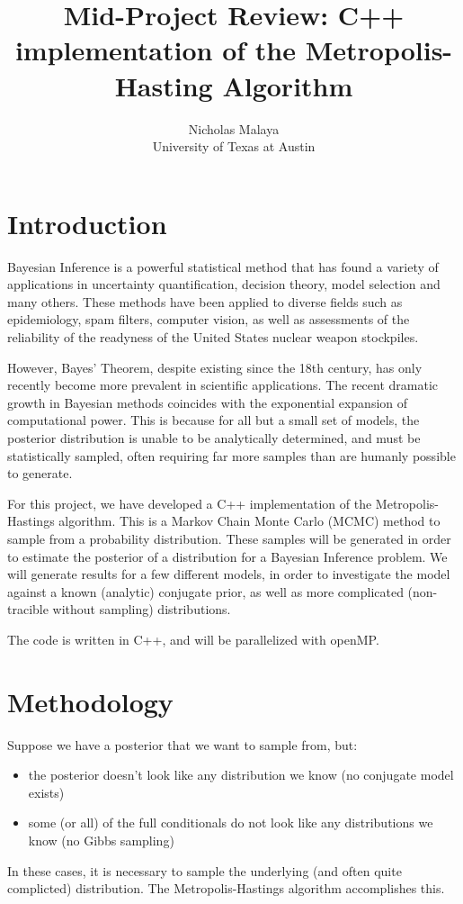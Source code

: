 \documentclass{article}
\title{\bf{Mid-Project Review: C++ implementation of the Metropolis-Hasting Algorithm}}
\author{Nicholas Malaya \\ University of Texas at Austin} \date{}
\begin{document}
\maketitle

\section{Introduction}

Bayesian Inference is a powerful statistical method that has found a
variety of applications in uncertainty quantification, decision theory,
model selection and many others. These methods have been applied to
diverse fields such as epidemiology, spam filters, computer vision, as
well as assessments of the reliability of the readyness of the United
States nuclear weapon stockpiles.  

However, Bayes' Theorem, despite existing since the 18th century, has
only recently become more prevalent in scientific applications. The
recent dramatic growth in Bayesian methods coincides with the
exponential expansion of computational power. This is because for all
but a small set of models, the posterior distribution is unable to be
analytically determined, and must be statistically sampled, often
requiring far more samples than are humanly possible to generate. 

For this project, we have developed a C++ implementation of the
Metropolis-Hastings algorithm. This is a Markov Chain Monte Carlo (MCMC)
method to sample from a probability distribution.  These samples will be
generated in order to estimate the posterior of a distribution for a
Bayesian Inference problem. We will generate results for a few different
models, in order to investigate the model against a known (analytic)
conjugate prior, as well as more complicated (non-tracible without
sampling) distributions.   

The code is written in C++, and will be parallelized with openMP. 
\section{Methodology}
%
%

Suppose we have a posterior that we want to sample from, but:
\begin{itemize}
 \item the posterior doesn't look like any distribution we know (no
       conjugate model exists)
 \item some (or all) of the full conditionals do not look like any
      distributions we know (no Gibbs sampling) 
\end{itemize}
In these cases, it is necessary to sample the underlying (and often
quite complicted) distribution. The Metropolis-Hastings algorithm
accomplishes this. 
\end{document}
